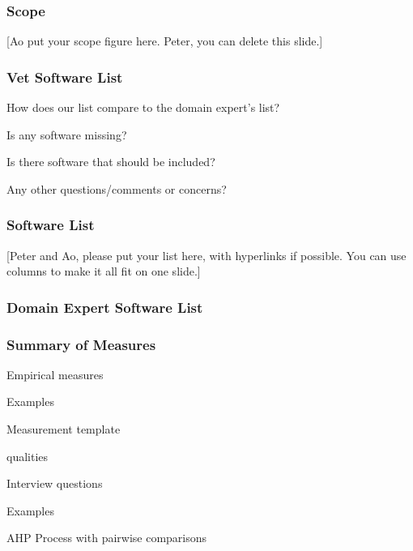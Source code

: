 \documentclass[t,12pt,numbers,fleqn]{beamer}
\begin{document}

\begin{frame}
\frametitle{Scope}

[Ao put your scope figure here.  Peter, you can delete this slide.]

\end{frame}


\begin{frame}
\frametitle{Vet Software List}

\bi
\item How does our list compare to the domain expert's list?
\item Is any software missing?
\item Is there software that should be included?
\item Any other questions/comments or concerns?  
\ei
  
\end{frame}


\begin{frame}
\frametitle{Software List}

[Peter and Ao, please put your list here, with hyperlinks if possible.  You can use
columns to make it all fit on one slide.]

\end{frame}


\begin{frame}
\frametitle{Domain Expert Software List}


\end{frame}


\begin{frame}
\frametitle{Summary of Measures}

\bi
\item Empirical measures
  \bi
  \item Examples
  \ei
\item Measurement template
  \bi
  \item qualities
  \ei
\item Interview questions
  \bi
  \item Examples
  \ei
  \item AHP Process with pairwise comparisons
\ei
\end{frame}
\end{document}
